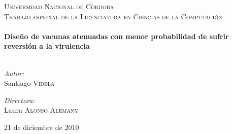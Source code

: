 \begin{titlepage}

\begin{center}


\textsc{\LARGE Universidad Nacional de C\'ordoba}\\[1.5cm]

\textsc{\Large Trabajo especial de la Licenciatura en Ciencias de la
Computaci\'on}\\[0.5cm]


\HRule \\[0.4cm]
{ \huge \bfseries Dise\~no de vacunas atenuadas con menor probabilidad de
sufrir reversi\'on a la virulencia}\\[0.4cm]

\HRule \\[1.5cm]

\begin{minipage}{0.4\textwidth}
\begin{flushleft} \large
\emph{Autor:}\\
Santiago \textsc{Videla}
\end{flushleft}
\end{minipage}
\begin{minipage}{0.4\textwidth}
\begin{flushright} \large
\emph{Directora:} \\
Laura \textsc{Alonso Alemany}
\end{flushright}
\end{minipage}

\vfill


{\large 21 de diciembre de 2010} 
\end{center}





\end{titlepage}